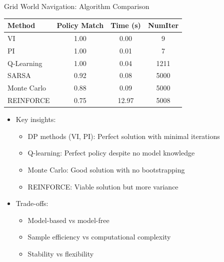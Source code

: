 \documentclass[10pt]{beamer}
\begin{document}

\begin{frame}{Grid World Navigation: Algorithm Comparison}
    \begin{table}
        \centering
        \small
        \begin{tabular}{lccc}
            \toprule
            \textbf{Method} & \textbf{Policy Match} & \textbf{Time (s)} & \textbf{NumIter} \\
            \midrule
            VI & 1.00 & 0.00 & 9 \\
            PI & 1.00 & 0.01 & 7 \\
            Q-Learning & 1.00 & 0.04 & 1211 \\
            SARSA & 0.92 & 0.08 & 5000 \\
            Monte Carlo & 0.88 & 0.09 & 5000 \\
            REINFORCE & 0.75 & 12.97 & 5008 \\
            \bottomrule
        \end{tabular}
    \end{table}
    
    \begin{itemize}
        \item Key insights:
        \begin{itemize}
            \item DP methods (VI, PI): Perfect solution with minimal iterations
            \item Q-learning: Perfect policy despite no model knowledge
            \item Monte Carlo: Good solution with no bootstrapping
            \item REINFORCE: Viable solution but more variance
        \end{itemize}
        \item Trade-offs:
        \begin{itemize}
            \item Model-based vs model-free
            \item Sample efficiency vs computational complexity
            \item Stability vs flexibility
        \end{itemize}
    \end{itemize}
\end{frame}

\end{document}
